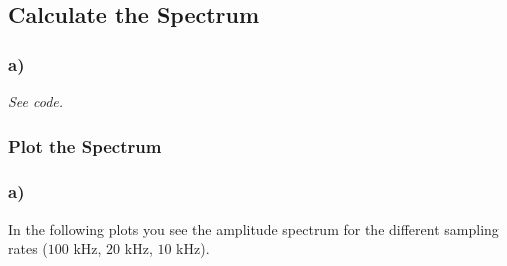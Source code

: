 \documentclass[
a4paper, 
12pt, 
]{article}
\begin{document}
\subsection{Calculate the Spectrum}
\subsubsection*{a)}
\textit{See code.}

\subsubsection{Plot the Spectrum}
\subsubsection*{a)}
In the following plots you see the amplitude spectrum for the different sampling rates ($100$ kHz, $20$ kHz, $10$ kHz). 
\end{document}
